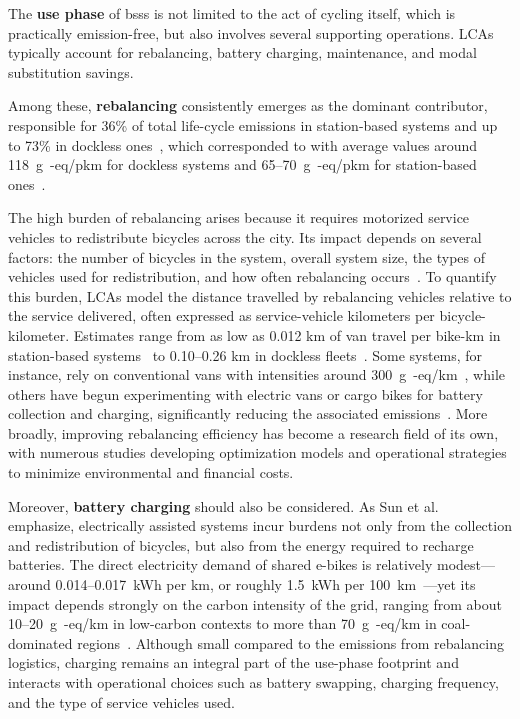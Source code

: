         The \textbf{use phase} of \acp{bss} is not limited to the act of cycling itself, which is practically emission-free, but also involves several supporting operations. LCAs typically account for rebalancing, battery charging, maintenance, and modal substitution savings. 
        
        Among these, \textbf{rebalancing} consistently emerges as the dominant contributor, responsible for 36\% of total life-cycle emissions in station-based systems and up to 73\% in dockless ones~\cite{Luo2019}, which corresponded to with average values around 118~g~-eq/pkm for dockless systems and 65--70~g~-eq/pkm for station-based ones~\cite{Luo2019}.

        The high burden of rebalancing arises because it requires motorized service vehicles to redistribute bicycles across the city. Its impact depends on several factors: the number of bicycles in the system, overall system size, the types of vehicles used for redistribution, and how often rebalancing occurs~\cite{Bonilla-Alicea2020}. To quantify this burden, LCAs model the distance travelled by rebalancing vehicles relative to the service delivered, often expressed as service-vehicle kilometers per bicycle-kilometer. Estimates range from as low as 0.012 km of van travel per bike-km in station-based systems~\cite{Felipe-Falgas2022} to 0.10–0.26 km in dockless fleets~\cite{Sun2022, Cazzola2020}. Some systems, for instance, rely on conventional vans with intensities around 300~g~-eq/km~\cite{Chen2020LifeCycle, Hollingsworth2019}, while others have begun experimenting with electric vans or cargo bikes for battery collection and charging, significantly reducing the associated emissions~\cite{Felipe-Falgas2022, Calan2024}. More broadly, improving rebalancing efficiency has become a research field of its own, with numerous studies developing optimization models and operational strategies to minimize environmental and financial costs.

        Moreover, \textbf{battery charging} should also be considered. As Sun et al.~\cite{Sun2022} emphasize, electrically assisted systems incur burdens not only from the collection and redistribution of bicycles, but also from the energy required to recharge batteries. The direct electricity demand of shared e-bikes is relatively modest—around 0.014--0.017~kWh per km, or roughly 1.5~kWh per 100~km~\cite{Sun2022}—yet its impact depends strongly on the carbon intensity of the grid, ranging from about 10--20~g~-eq/km in low-carbon contexts to more than 70~g~-eq/km in coal-dominated regions~\cite{Zhu2023, Calan2024}. Although small compared to the emissions from rebalancing logistics, charging remains an integral part of the use-phase footprint and interacts with operational choices such as battery swapping, charging frequency, and the type of service vehicles used.

